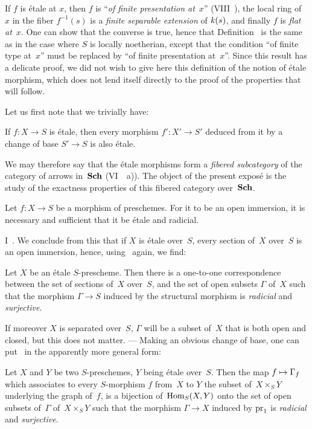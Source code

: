 \begin{remarks}
\label{IX.1.2}
If $f$ is \'etale at $x$, then $f$ is ``\emph{of finite
presentation at}~$x$'' (VIII~), the local ring of~$x$
in the fiber $f^{-1}(s)$ is a \emph{finite separable extension} of
$\mathit{k}(s)$, and finally $f$ is \emph{flat at}~$x$. One can show
that the converse is true, hence that Definition~ is
the same as in the case where $S$ is locally noetherian, except
that the condition ``of finite type at~$x$'' must be replaced by
``of finite presentation at~$x$''. Since this result has a
delicate proof, we did not wish to give here this definition of
the notion of \'etale morphism, which does not lend itself
directly to the proof of the properties that will follow.
\end{remarks}

Let us first note that we trivially have:
\begin{proposition}
\label{IX.1.3}
If $f\colon X\to S$ is \'etale, then every morphism $f'\colon
X'\to S'$ deduced from it by a change of base $S'\to S$ is
also \'etale.
\end{proposition}

We may therefore say that the \'etale morphisms form a
\emph{fibered subcategory} of the category of
arrows in~$\mathbf{Sch}$
(\cf VI~~a)). The object of the present
expos\'e is the study of the exactness properties of
this fibered category over~$\mathbf{Sch}$.
\begin{proposition}
\label{IX.1.4}
Let $f\colon X\to S$ be a morphism of preschemes. For it to be
an open immersion, it is necessary and sufficient that it be
\'etale and radicial.
\end{proposition}

\Cf I~. We conclude from this that if $X$ is \'etale
over~$S$, every section of~$X$ over~$S$ is an open immersion, hence,
using~ again, we find:
\begin{corollary}
\label{IX.1.5}
Let $X$ be an \'etale $S$-prescheme. Then there is a
one-to-one correspondence between the set of sections of~$X$
over~$S$, and the set of
open subsets $\Gamma$ of~$X$ such that the morphism $\Gamma \to S$
induced by the structural morphism is \emph{radicial} and
\emph{surjective}.
\end{corollary}

If moreover $X$ is separated over~$S$, $\Gamma$ will be a subset
of~$X$ that is both open and closed, but this does not matter. ---
Making an obvious change of base, one can put~
in the apparently more general form:
\begin{corollary}
\label{IX.1.6}
Let $X$ and $Y$ be two $S$-preschemes, $Y$ being \'etale
over~$S$. Then the map $f \mto \Gamma_f$ which associates to
every $S$-morphism $f$ from~$X$ to $Y$ the subset of~$X\times_S Y$
underlying the graph of~$f$, is a bijection of~$\operatorname{Hom}_S(X,Y)$ onto
the set of open subsets of~$\Gamma$ of~$X\times_S Y$ such
that the morphism $\Gamma\to X$ induced by $\mathrm{pr}_1$ is
\emph{radicial} and \emph{surjective}.
\end{corollary}

